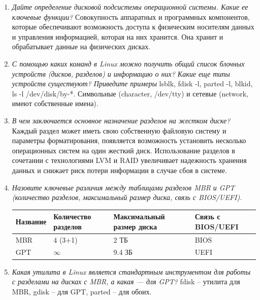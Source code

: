 
\begin{enumerate}
	\item \textit{Дайте определение дисковой подсистемы операционной системы. Какие ее ключевые функции?}\newline 
	Совокупность аппаратных и программных компонентов, которые обеспечивают возможность доступа к физическим носителям данных и управления информацией, которая на них хранится.
	Она хранит и обрабатывает данные на физических дисках.
	\item \textit{С помощью каких команд в Linux можно получить общий список блочных устройств (дисков, разделов) и информацию о них? Какие еще типы устройств существуют? Приведите примеры}\newline 
	lsblk, fdisk -l, parted -l, blkid, ls -l /dev/disk/by-*.
	Символьные (character, /dev/tty) и сетевые (network, имеют собственные имена).
	\item \textit{В чем заключается основное назначение разделов на жестком диске?}\newline 
	Каждый раздел может иметь свою собственную файловую систему и параметры форматирования, появляется возможность установить несколько операционных систем на один жесткий диск.
	Использование разделов в сочетании с технологиями LVM и RAID
	увеличивает надежность хранения данных и снижает риск потери информации в случае сбоя в системе.
	\item \textit{Назовите ключевые различия между таблицами разделов MBR и GPT (количество разделов, максимальный размер диска, связь с BIOS/UEFI).}\newline 
	\begin{tabularx}{0.9\textwidth}{|X|X|p{4cm}|X|}
		\hline
		\textbf{Название} & \textbf{Количество разделов} & \textbf{Максимальный размер диска} & \textbf{Связь с BIOS/UEFI} \\\hline
		MBR & 4 (3+1) & 2 ТБ & BIOS\\\hline
		GPT & $\infty$ &  9.4 ЗБ & UEFI \\\hline
	\end{tabularx}
	\item \textit{Какая утилита в Linux является стандартным инструментом для работы с разделами на дисках с MBR, а какая — для GPT?}\newline 
	fdisk -- утилита для MBR, gdisk -- для GPT, parted -- для обоих.

\end{enumerate}
